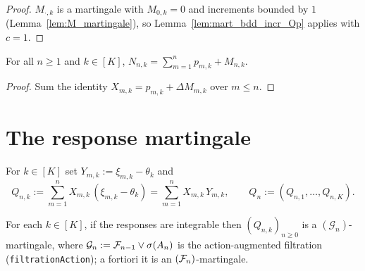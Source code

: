 \begin{proof}\leanok
{}
$M_{\cdot,k}$ is a martingale with $M_{0,k}=0$ and increments bounded by $1$
(Lemma~\ref{lem:M_martingale}), so Lemma~\ref{lem:mart_bdd_incr_Op} applies with
$c = 1$.
\end{proof}

\begin{lemma}\label{lem:count_decomp}
\leanok
{}
For all $n\ge1$ and $k\in[K]$,
$\displaystyle N_{n,k} = \sum_{m=1}^n p_{m,k} + M_{n,k}$.
\end{lemma}

\begin{proof}\leanok
Sum the identity $X_{m,k} = p_{m,k} + \Delta M_{m,k}$ over $m \le n$.
\end{proof}

\section{The response martingale}
\label{sec:aux_response}

\begin{definition}\label{def:Q}
\leanok
{}
For $k \in [K]$ set $Y_{m,k} := \xi_{m,k} - \theta_k$ and
\[
  Q_{n,k} := \sum_{m=1}^n X_{m,k}\,(\xi_{m,k} - \theta_k)
           = \sum_{m=1}^n X_{m,k}\,Y_{m,k},
  \qquad Q_n := (Q_{n,1}, \dots, Q_{n,K}).
\]
\end{definition}

\begin{lemma}[$Q$ is a martingale]\label{lem:Q_martingale}
\leanok
{}
For each $k \in [K]$, if the responses are integrable then $(Q_{n,k})_{n\ge0}$ is a
$(\mathcal{G}_n)$-martingale, where $\mathcal{G}_n := \mathcal{F}_{n-1}\vee\sigma(A_n)$ is the
action-augmented filtration (\texttt{filtrationAction}); a fortiori it is an
$(\mathcal{F}_n)$-martingale.
\end{lemma}

